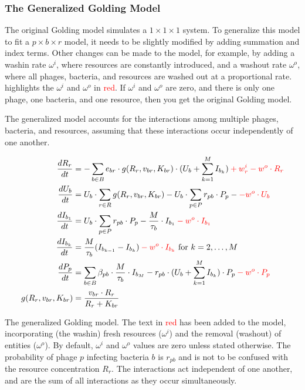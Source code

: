 \subsubsection{The Generalized Golding Model}
\label{sec:adapted_golding_model}
The original Golding model simulates a $1\times 1 \times 1$ system. 
To generalize this model to fit a $p \times b \times r$ model, it needs to be slightly modified by adding summation and index terms. 
Other changes can be made to the model, for example, by adding a washin rate $\omega^{i}$, where resources are constantly introduced, and a washout rate $\omega^{o}$, where all phages, bacteria, and resources are washed out at a proportional rate. 
 highlights the $\omega^i$ and $\omega^o$ in \textcolor{red}{red}. 
If $\omega^i$ and $\omega^o$ are zero, and there is only one phage, one bacteria, and one resource, then you get the original Golding model. 

The generalized model accounts for the interactions among multiple phages, bacteria, and resources, assuming that these interactions occur independently of one another. 

\begin{eqfloat}
    \begin{align}
        \frac{dR_r}{dt} &= -\sum_{b \in B} e_{b r} \cdot g(R_r, v_{b r}, K_{b r})\cdot (U_b + \sum_{k=1}^{M} I_{b_k}) \mathcolor{red}{+ w^i_r -w^o \cdot R_r}\\
        \frac{dU_b}{dt} &= U_b \cdot \sum_{r \in R} g(R_r, v_{b r}, K_{b r}) - U_b \cdot \sum_{p \in P} r_{p b} \cdot P_p -\mathcolor{red}{-w^o \cdot U_b}\\
        \frac{dI_{b_1}}{dt} &= U_b \cdot \sum_{p \in P}r_{p b} \cdot P_p - \frac{M}{\tau_b}\cdot I_{b_1} \mathcolor{red}{-w^o \cdot I_{b_1}}\\
        \frac{dI_{b_k}}{dt} &= \frac{M}{\tau_b}(I_{b_{k-1}}-I_{b_k}) \mathcolor{red}{-w^o \cdot I_{b_k}}\text{ for } k=2, \dots, M \\
        \frac{dP_p}{dt} &= \sum_{b\in B}\beta_{p b}\cdot\frac{M}{\tau_b} \cdot I_{b_M} - r_{p b}\cdot(U_b + \sum_{k=1}^{M} I_{b_k})\cdot P_p \mathcolor{red}{-w^o \cdot P_p}\\
        g(R_r, v_{b r}, K_{b r}) &= \frac{v_{b r} \cdot R_r}{R_r + K_{b r}}
        \label{eq:adapted_golding_model}
    \end{align} 
    \caption{
        The generalized Golding model. 
        The text in \textcolor{red}{red} has been added to the model, incorporating (the washin) fresh resources ($\omega^i$) and the removal (washout) of entities ($\omega^o$). 
        By default, $\omega^i$ and $\omega^o$ values are zero unless stated otherwise.
        The probability of phage $p$ infecting bacteria $b$ is $r_{pb}$ and is not to be confused with the resource concentration $R_r$. 
        The interactions act independent of one another, and are the sum of all interactions as they occur simultaneously. 
    }
\end{eqfloat}

